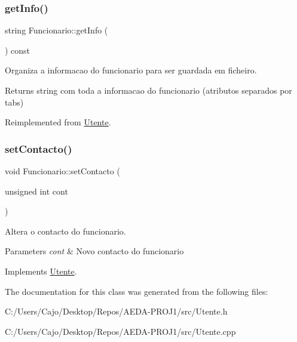 \mbox{\label{class_funcionario_a3cafb55c689dcb260975d3083cef1a98}} 
\subsubsection{\texorpdfstring{get\+Info()}{getInfo()}}
{\footnotesize\ttfamily string Funcionario\+::get\+Info (\begin{DoxyParamCaption}{ }\end{DoxyParamCaption}) const\hspace{0.3cm}{\ttfamily [virtual]}}



Organiza a informacao do funcionario para ser guardada em ficheiro. 

\begin{DoxyReturn}{Returns}
string com toda a informacao do funcionario (atributos separados por tabs) 
\end{DoxyReturn}


Reimplemented from \mbox{\hyperlink{class_utente_aee03eae2a7154e7b4713b2be195d548f}{Utente}}.

\mbox{\label{class_funcionario_a2288d370e92da8b533c09db5b90d888c}} 
\subsubsection{\texorpdfstring{set\+Contacto()}{setContacto()}}
{\footnotesize\ttfamily void Funcionario\+::set\+Contacto (\begin{DoxyParamCaption}\item[{unsigned int}]{cont }\end{DoxyParamCaption})\hspace{0.3cm}{\ttfamily [virtual]}}



Altera o contacto do funcionario. 


\begin{DoxyParams}{Parameters}
{\em cont} & Novo contacto do funcionario \\
\hline
\end{DoxyParams}


Implements \mbox{\hyperlink{class_utente}{Utente}}.



The documentation for this class was generated from the following files\+:\begin{DoxyCompactItemize}
\item 
C\+:/\+Users/\+Cajo/\+Desktop/\+Repos/\+A\+E\+D\+A-\/\+P\+R\+O\+J1/src/Utente.\+h\item 
C\+:/\+Users/\+Cajo/\+Desktop/\+Repos/\+A\+E\+D\+A-\/\+P\+R\+O\+J1/src/Utente.\+cpp\end{DoxyCompactItemize}
